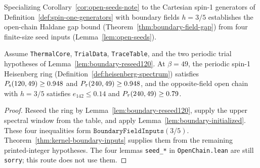 Specializing Corollary~\ref{cor:open-seeds-note} to the Cartesian spin-1 generators of
Definition~\ref{def:spin-one-generators} with boundary fields \(h = 3/5\) establishes the open-chain
Haldane gap bound (Theorem~\ref{thm:boundary-field-gap}) from four finite-size seed inputs
(Lemma~\ref{lem:open-seeds}).

\begin{lemma}
  \label{lem:open-seeds}
  \leanok
  Assume \texttt{ThermalCore}, \texttt{TrialData}, \texttt{TraceTable}, and the two periodic
  trial hypotheses of Lemma~\ref{lem:boundary-reseed120}.
  At \(\beta = 49\), the periodic spin-1 Heisenberg ring (Definition~\ref{def:heisenberg-spectrum})
  satisfies \(P_{\mathrm{s}}(120, 49) \ge 0.948\) and \(P_{\tau}(240, 49) \ge 0.948\), and the opposite-field open
  chain with \(h = 3/5\) satisfies \(e_{142} \le 0.14\) and \(P_{\tau}(240, 49) \ge 0.79\).
\end{lemma}
\begin{proof}
  \leanok
  Reseed the ring by Lemma~\ref{lem:boundary-reseed120}, supply the upper spectral window from
  the table, and apply Lemma~\ref{lem:boundary-initialized}.
  These four inequalities form \(\texttt{BoundaryFieldInputs}(3/5)\).
  Theorem~\ref{thm:kernel-boundary-inputs} supplies them from the remaining printed-integer
  hypotheses. The four lemmas \texttt{seed\_*} in \texttt{OpenChain.lean} are still
  \texttt{sorry}; this route does not use them.
\end{proof}

